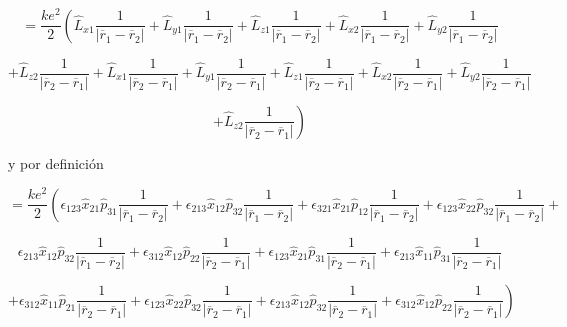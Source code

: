 \documentclass[12pt,a4paper]{article}
\begin{document}
\begin{enumerate}
\begin{equation*}
    =\frac{ke^2}{2}\left(\hat{L}_{x1}\frac{1}{|\overline{r}_{1} - \overline{r}_2|} + \hat{L}_{y1}\frac{1}{|\overline{r}_{1} - \overline{r}_2|} + \hat{L}_{z1}\frac{1}{|\overline{r}_{1} - \overline{r}_2|} + \hat{L}_{x2}\frac{1}{|\overline{r}_{1} - \overline{r}_2|}+ \hat{L}_{y2}\frac{1}{|\overline{r}_{1} - \overline{r}_2|}  \right.
\end{equation*}

\begin{equation*}
    + \hat{L}_{z2}\frac{1}{|\overline{r}_{2} - \overline{r}_1|} +\hat{L}_{x1}\frac{1}{|\overline{r}_{2} - \overline{r}_1|} + \hat{L}_{y1}\frac{1}{|\overline{r}_{2} - \overline{r}_1|} + \hat{L}_{z1}\frac{1}{|\overline{r}_{2} - \overline{r}_1|} + \hat{L}_{x2}\frac{1}{|\overline{r}_{2} - \overline{r}_1|}+ \hat{L}_{y2}\frac{1}{|\overline{r}_{2} - \overline{r}_1|} 
\end{equation*}

\begin{equation*}
    \left.+ \hat{L}_{z2}\frac{1}{|\overline{r}_{2} - \overline{r}_1|} \right)
\end{equation*}

y por definición

\begin{equation*}
    =\frac{ke^2}{2}\left(\epsilon_{123}\hat{x}_{21} \hat{p}_{31} \frac{1}{|\overline{r}_{1} - \overline{r}_2|} + \epsilon_{213}\hat{x}_{12} \hat{p}_{32}\frac{1}{|\overline{r}_{1} - \overline{r}_2|} +\epsilon_{321}\hat{x}_{21} \hat{p}_{12}\frac{1}{|\overline{r}_{1} - \overline{r}_2|} + \epsilon_{123}\hat{x}_{22} \hat{p}_{32}\frac{1}{|\overline{r}_{1} - \overline{r}_2|}+ \right.
\end{equation*}

\begin{equation*}
     \epsilon_{213}\hat{x}_{12} \hat{p}_{32}\frac{1}{|\overline{r}_{1} - \overline{r}_2|} + \epsilon_{312}\hat{x}_{12} \hat{p}_{22}\frac{1}{|\overline{r}_{2} - \overline{r}_1|} +\epsilon_{123}\hat{x}_{21} \hat{p}_{31}\frac{1}{|\overline{r}_{2} - \overline{r}_1|} + \epsilon_{213}\hat{x}_{11} \hat{p}_{31}\frac{1}{|\overline{r}_{2} - \overline{r}_1|} 
\end{equation*}

\begin{equation*}
    \left.+\epsilon_{312} \hat{x}_{11} \hat{p}_{21}\frac{1}{|\overline{r}_{2} - \overline{r}_1|} +\epsilon_{123} \hat{x}_{22} \hat{p}_{32}\frac{1}{|\overline{r}_{2} - \overline{r}_1|}+\epsilon_{213}\hat{x}_{12} \hat{p}_{32}\frac{1}{|\overline{r}_{2} - \overline{r}_1|} + \epsilon_{312}\hat{x}_{12} \hat{p}_{22}\frac{1}{|\overline{r}_{2} - \overline{r}_1|} \right)
\end{equation*}







\end{enumerate}
\end{document}
